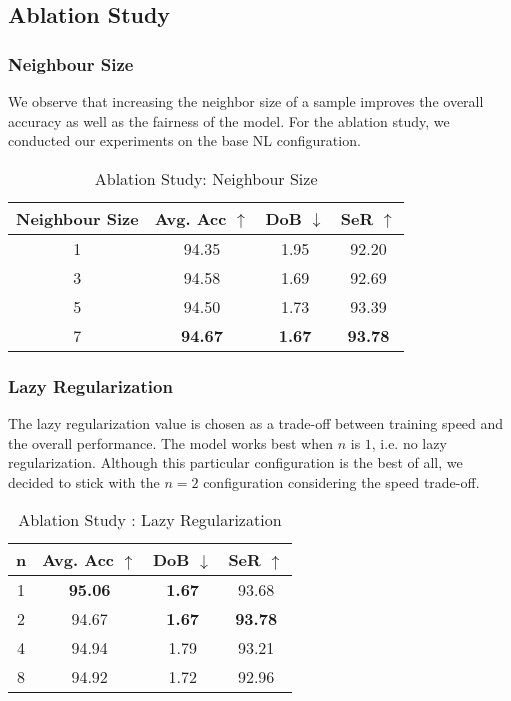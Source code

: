 \documentclass[runningheads]{llncs}
\begin{document}
\subsection{Ablation Study}
\subsubsection{Neighbour Size}
We observe that increasing the neighbor size of a sample improves the overall accuracy as well as the fairness of the model. For the ablation study, we conducted our experiments on the base NL configuration.

\begin{table}[H]
    \centering
    \caption{Ablation Study: Neighbour Size}
    \label{tab:ablate_neighbour}
    \begin{tabular}{cccc} 
    \toprule
    \textbf{Neighbour Size} & \textbf{Avg. Acc $\uparrow$} & \textbf{DoB $\downarrow$} & \textbf{SeR $\uparrow$} \\ \midrule
    1 & 94.35 & 1.95 & 92.20 \\
    3 & 94.58 & 1.69 & 92.69 \\
    5 & 94.50 & 1.73 & 93.39 \\
    7 & \textbf{94.67} & \textbf{1.67} & \textbf{93.78}\\
    \bottomrule
    \end{tabular}
    
\end{table}

\subsubsection{Lazy Regularization}
The lazy regularization value is chosen as a trade-off between training speed and the overall performance. The model works best when $n$ is $1$, i.e. no lazy regularization. Although this particular configuration is the best of all, we decided to stick with the $n=2$ configuration considering the speed trade-off.
\begin{table}[H]
    \centering
    \caption{Ablation Study : Lazy Regularization}
    \label{tab:ablate_lazy}
    \begin{tabular}{cccc} 
    \toprule
    \textbf{n} & \textbf{Avg. Acc $\uparrow$} & \textbf{DoB $\downarrow$} & \textbf{SeR $\uparrow$} \\ \midrule
    1 & \textbf{95.06} & \textbf{1.67} & 93.68 \\
    2 & 94.67 & \textbf{1.67} & \textbf{93.78} \\
    4 & 94.94 & 1.79 & 93.21 \\
    8 & 94.92 & 1.72 & 92.96 \\
    \bottomrule
    \end{tabular}
\end{table}
\end{document}
